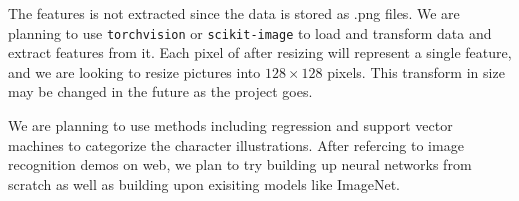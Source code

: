 \documentclass[12pt]{article}
\begin{document}
The features is not extracted since the data is stored as .png files.
We are planning to use \texttt{torchvision} or \texttt{scikit-image} to load and transform data and extract features from it.
Each pixel of after resizing will represent a single feature, and we are looking to resize pictures into $128 \times 128$ pixels.
This transform in size  may be changed in the future as the project goes.

We are planning to use methods including regression and support vector machines to categorize the character illustrations. After refercing to image recognition demos on web, we plan to try building up neural networks from scratch as well as building upon exisiting models like ImageNet. 
\end{document}
